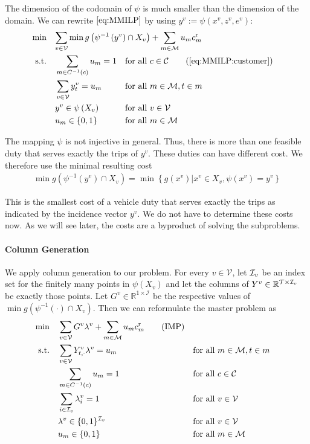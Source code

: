 The dimension of the codomain of $\psi$ is much smaller than the dimension of the domain. We can rewrite $\eqref{eq:MMILP}$ by using $y^v:=\psi\left(x^v,z^v,e^v\right)$:
\begin{align*}
	\min \quad & \omit\rlap{$\displaystyle{\sum_{v\in\mathcal{V}}\min g\left(\psi^{-1}\left(y^v\right)\cap X_v\right) + \sum_{m\in\mathcal{M}}u_m\croute_m}$} \\
	\text{s.t.} \quad & \sum_{m\in C^{-1}(c)} u_m = 1 && \text{for all } c\in\mathcal{C} \tag{\ref{eq:MMILP:customer}} \\
	& \sum_{v\in\mathcal{V}}y^v_t = u_m && \text{for all } m\in\mathcal{M},t\in m \\
	& y^v\in \psi\left(X_v\right) && \text{for all } v\in\mathcal{V} \\
	& u_m\in\{0,1\} && \text{for all } m\in\mathcal{M}
\end{align*}

The mapping $\psi$ is not injective in general. Thus, there is more than one feasible duty that serves exactly the trips of $y^v$. These duties can have different cost. We therefore use the minimal resulting cost
\begin{align*}
	\min g\left(\psi^{-1}\left(y^v\right)\cap X_v\right) = \min \left\{g\left(x^v\right)|x^v\in X_v, \psi\left(x^v\right)=y^v\right\}
\end{align*}

This is the smallest cost of a vehicle duty that serves exactly the trips as indicated by the incidence vector $y^v$. We do not have to determine these costs now. As we will see later, the costs are a byproduct of solving the subproblems.

\paragraph{Column Generation} \parfill

We apply column generation to our problem. For every $v\in\mathcal{V}$, let $\mathcal{I}_v$ be an index set for the finitely many points in $\psi\left(X_v\right)$ and let the columns of $Y^v\in\mathbb{R}^{\mathcal{T}\times\mathcal{I}_v}$ be exactly those points. Let $G^v\in\mathbb{R}^{1\times\mathcal{I}}$ be the respective values of $\min g\left(\psi^{-1}(\cdot)\cap X_v\right)$. Then we can reformulate the master problem as
\begin{align*}
	\min \quad & \sum_{v\in\mathcal{V}}G^v\lambda^v + \sum_{m\in\mathcal{M}}u_mc^{\operatorname{r}}_m \tag{IMP} \label{eq:IMP} \\
	\text{s.t.} \quad & \sum_{v\in\mathcal{V}} Y^v_{t,\cdot}\lambda^v = u_m && \text{for all } m\in\mathcal{M},t\in m \\
	& \sum_{m\in C^{-1}(c)} u_m = 1 && \text{for all } c\in\mathcal{C} \\
	& \sum_{i\in\mathcal{I}_v}\lambda_i^v=1 && \text{for all } v\in\mathcal{V}\\
	& \lambda^v\in\{0,1\}^{\mathcal{I}_v} && \text{for all } v\in\mathcal{V} \\
	& u_m\in\{0,1\} && \text{for all } m\in\mathcal{M}
\end{align*}

